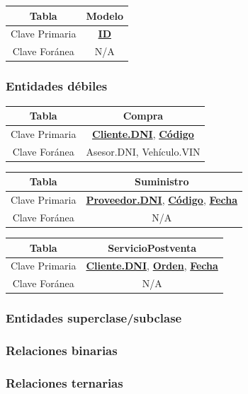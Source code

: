 \documentclass[12pt]{article}
\begin{document}
\begin{tabular}{|c|c|}
\hline
Tabla & Modelo \\
\hline
Clave Primaria & \textbf{\underline{ID}} \\
\hline
Clave Foránea & N/A \\
\hline
\end{tabular}


\subsubsection{Entidades d\'ebiles}

\begin{tabular}{|c|c|}
\hline
Tabla & Compra \\
\hline
Clave Primaria & \textbf{\underline{Cliente.DNI}}, \textbf{\underline{Código}} \\
\hline
Clave Foránea & Asesor.DNI, Vehículo.VIN \\
\hline
\end{tabular}

\begin{tabular}{|c|c|}
\hline
Tabla & Suministro \\
\hline
Clave Primaria & \textbf{\underline{Proveedor.DNI}}, \textbf{\underline{Código}}, \textbf{\underline{Fecha}} \\
\hline
Clave Foránea & N/A \\
\hline
\end{tabular}

\begin{tabular}{|c|c|}
\hline
Tabla & ServicioPostventa \\
\hline
Clave Primaria & \textbf{\underline{Cliente.DNI}}, \textbf{\underline{Orden}}, \textbf{\underline{Fecha}} \\
\hline
Clave Foránea & N/A \\
\hline
\end{tabular}


\subsubsection{Entidades superclase/subclase}



\subsubsection{Relaciones binarias}
\subsubsection{Relaciones ternarias}
\end{document}
